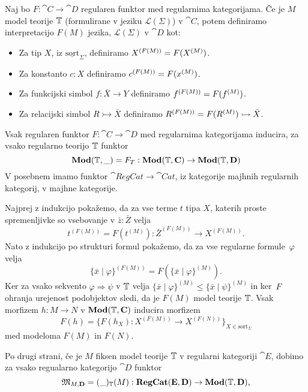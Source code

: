 \documentclass[../kategoricna_logika.tex]{subfiles}
\begin{document}
\begin{definicija}
  Naj bo $F : \cat{C} \to \cat{D}$ regularen funktor med regularnima
  kategorijama.  Če je $M$ model teorije $\T$ (formulirane v jeziku
  $\mathcal{L}(\Sigma)$) v $\cat{C}$, potem definiramo interpretacijo
  $F(M)$ jezika, $\mathcal{L}(\Sigma)$ v $\cat{D}$ kot:
  \begin{itemize}
  \item Za tip $X$, iz $\underline{\mathrm{sort}}_\Sigma$, definiramo
    $\interp[F(M)]{X} = F(\interp{X})$.
  \item Za konstanto $c:X$ definiramo
    $\interp[F(M)]{c} = F(\interp{x})$.
  \item Za funkcijski simbol $f : \bar{X} \to Y$ definiramo
    $\interp[F(M)]{f} = F(\interp{f})$.
  \item Za relacijski simbol $R \rightarrowtail \bar{X}$ definiramo
    $\interp[F(M)]{R} = F(\interp{R}) \rightarrowtail \bar{X}$.
  \end{itemize}
\end{definicija}
\begin{lema}\label{lema:regularen-funktor-slika-model-v-model}
  Vsak regularen funktor $F : \cat{C} \to \cat{D}$ med regularnima
  kategorijama inducira, za vsako regularno teorijo $\T$ funktor
  $$\Mod(\T, \_)=F_T : \Mod(\T,\cat{C}) \to \Mod(\T, \cat{D})$$
  V posebnem imamo funktor $\cat{RegCat} \to \cat{Cat}$, iz kategorije
  majhnih regularnih kategorij, v majhne kategorije.
\end{lema}
\begin{dokaz}
  Najprej z indukcijo pokažemo, da za vse terme $t$ tipa $X$, katerih
  proste spremenljivke so vsebovanje v $\bar{z} : \bar{Z}$ velja
  \[ t^{(F(M))} = F(t^{(M)}) : \bar{Z}^{(F(M))} \to X^{(F(M))}.\]
  Nato z indukcijo po strukturi formul pokažemo, da za vse regularne formule~$\varphi$ velja
  \[ \{ \bar{x} \mid \varphi\}^{(F(M))} = F(\{\bar{x} \mid \varphi \}^{(M)}).\]
  Ker za vsako sekvento $\varphi \Rightarrow \psi$ v $\T$ velja
  $\{\bar{x} \mid \varphi\}^{(M)} \leq \{\bar{x} \mid \psi \}^{(M)}$
  in ker~$F$ ohranja urejenost podobjektov sledi, da je $F(M)$ model
  teorije $\T$. Vsak morfizem $h : M \to N$ v $\Mod(\T, \cat{C})$
  inducira morfizem
  \[ F(h) = \{ F(h_X) : X^{(F(M))} \to X^{(F(N))}\}_{X \in \mathrm{sort}_{\Sigma}}\]
  med modeloma $F(M)$ in $F(N)$.
\end{dokaz}
Po drugi strani, če je $M$ fiksen model teorije $\T$ v regularni
kategoriji $\cat{E}$, dobimo za vsako regualarno kategorijo $\cat{D}$
funktor
\begin{equation}\label{equation:def-funktor-iz-regcat-v-mod}
  \mathfrak{M}_{M,\cat{D}} = (\_)_\T(M): \cat{RegCat}(\cat{E}, \cat{D}) \to \Mod(\T, \cat{D}),
\end{equation}
\end{document}
